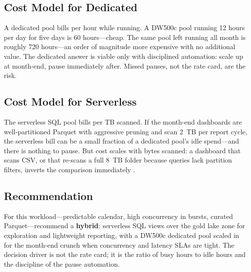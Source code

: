 \subsection{Cost Model for Dedicated}
A dedicated pool bills per hour while running. A DW500c pool running 12 hours per day for five days is 60 hours---cheap. The same pool left running all month is roughly 720 hours---an order of magnitude more expensive with no additional value. The dedicated answer is viable only with disciplined automation: scale up at month-end, pause immediately after. Missed pauses, not the rate card, are the risk.

\subsection{Cost Model for Serverless}
The serverless SQL pool bills per TB scanned. If the month-end dashboards are well-partitioned Parquet with aggressive pruning and scan 2~TB per report cycle, the serverless bill can be a small fraction of a dedicated pool's idle spend---and there is nothing to pause. But cost scales with bytes scanned: a dashboard that scans CSV, or that re-scans a full 8~TB folder because queries lack partition filters, inverts the comparison immediately \cite{microsoft2025synapseServerless}.

\subsection{Recommendation}
For this workload---predictable calendar, high concurrency in bursts, curated Parquet---recommend a \textbf{hybrid}: serverless SQL views over the gold lake zone for exploration and lightweight reporting, with a DW500c dedicated pool scaled in for the month-end crunch when concurrency and latency SLAs are tight. The decision driver is not the rate card; it is the ratio of busy hours to idle hours and the discipline of the pause automation.

